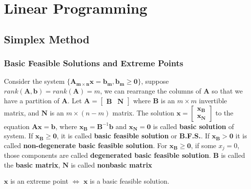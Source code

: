 

\part{Linear Programming}
	\chapter{Simplex Method}
		\section{Basic Feasible Solutions and Extreme Points}
			\begin{definition}
				Consider the system $\{\mathbf{A_{m\times n}x} = \mathbf{b_m}, \mathbf{b_m}\ge \mathbf{0}\}$, suppose $rank(\mathbf{A}, \mathbf{b}) = rank(\mathbf{A}) = m$, we can rearrange the columns of $\mathbf{A}$ so that we have a partition of $\mathbf{A}$. Let $\mathbf{A} = \left[\begin{matrix}\mathbf{B} & \mathbf{N}\end{matrix}\right]$ where $\mathbf{B}$ is an $m\times m$ invertible matrix, and $\mathbf{N}$ is an $m\times (n-m)$ matrix. The solution $\mathbf{x}=\left[\begin{matrix}\mathbf{x_B}\\\mathbf{x_N}\end{matrix}\right]$ to the equation $\mathbf{Ax} = \mathbf{b}$, where $\mathbf{x_B} = \mathbf{B}^{-1} \mathbf{b}$ and $\mathbf{x_N} = \mathbf{0}$ is called \textbf{basic solution} of system. If $\mathbf{x_B} \ge \mathbf{0}$, it is called \textbf{basic feasible solution} or \textbf{B.F.S.}. If $\mathbf{x_B} > \mathbf{0}$ it is called \textbf{non-degenerate basic feasible solution}. For $\mathbf{x_B} \ge \mathbf{0}$, if some $x_j = 0$, those components are called \textbf{degenerated basic feasible solution}. $\mathbf{B}$ is called the \textbf{basic matrix}, $\mathbf{N}$ is called \textbf{nonbasic matrix}
			\end{definition}

			\begin{theorem}
				$\mathbf{x}$ is an extreme point $\iff$ $\mathbf{x}$ is a basic feasible solution.
			\end{theorem}

